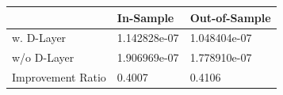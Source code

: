 \begin{tabular}{lll}
\toprule
 & In-Sample & Out-of-Sample \\
\midrule
w. D-Layer & 1.142828e-07 & 1.048404e-07 \\
w/o D-Layer & 1.906969e-07 & 1.778910e-07 \\
Improvement Ratio & 0.4007 & 0.4106 \\
\bottomrule
\end{tabular}

